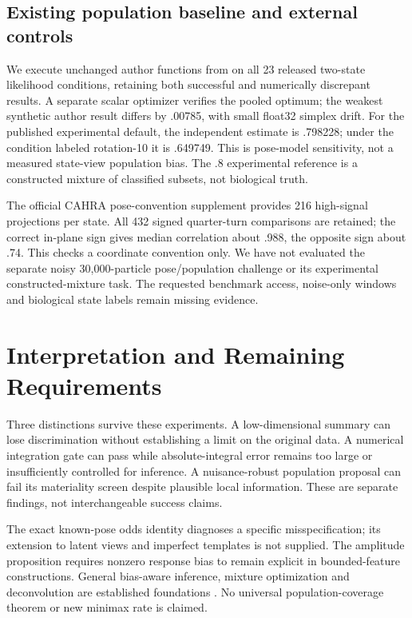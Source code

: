 \documentclass{article}
\begin{document}
\subsection{Existing population baseline and external controls}
We execute unchanged author functions from \citet{counting2026} on all
23 released two-state likelihood conditions, retaining both successful
and numerically discrepant results. A separate scalar optimizer verifies
the pooled optimum; the weakest synthetic author result differs by .00785,
with small float32 simplex drift. For the published experimental default,
the independent estimate is .798228; under the condition labeled
rotation-10 it is .649749. This is pose-model sensitivity, not a measured
state-view population bias. The .8 experimental reference is a constructed
mixture of classified subsets, not biological truth.

The official CAHRA pose-convention supplement provides 216 high-signal
projections per state. All 432 signed quarter-turn comparisons are retained;
the correct in-plane sign gives median correlation about .988, the opposite
sign about .74. This checks a coordinate convention only. We have not
evaluated the separate noisy 30,000-particle pose/population challenge or
its experimental constructed-mixture task. The requested benchmark access,
noise-only windows and biological state labels remain missing evidence.

\section{Interpretation and Remaining Requirements}
Three distinctions survive these experiments. A low-dimensional summary can
lose discrimination without establishing a limit on the original data.
A numerical integration gate can pass while absolute-integral error remains
too large or insufficiently controlled for inference. A nuisance-robust
population proposal can fail its materiality screen despite plausible local
information. These are separate findings, not interchangeable success claims.

The exact known-pose odds identity diagnoses a specific misspecification;
its extension to latent views and imperfect templates is not supplied.
The amplitude proposition requires nonzero response bias to remain explicit
in bounded-feature constructions. General bias-aware inference, mixture
optimization and deconvolution are established foundations
\citep{donoho1994,armstrong2018,lindsay1983,npmle2024,pensky2017}.
No universal population-coverage theorem or new minimax rate is claimed.
\end{document}
